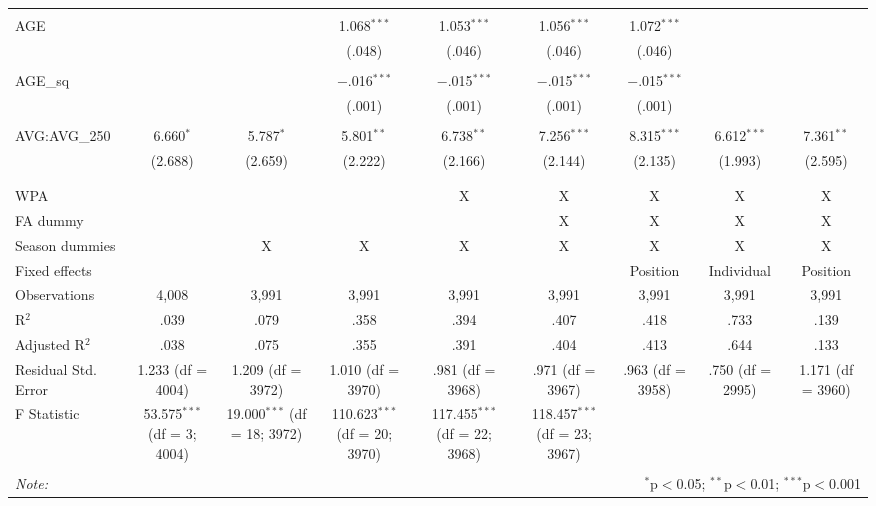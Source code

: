 \begin{table}[H]
\begin{tabular}{@{\extracolsep{5pt}}lcccccccc}
  & & & & & & & & \\
 AGE &  &  & 1.068$^{***}$ & 1.053$^{***}$ & 1.056$^{***}$ & 1.072$^{***}$ &  &  \\
  &  &  & (.048) & (.046) & (.046) & (.046) &  &  \\
  & & & & & & & & \\
 AGE\_sq &  &  & $-$.016$^{***}$ & $-$.015$^{***}$ & $-$.015$^{***}$ & $-$.015$^{***}$ &  &  \\
  &  &  & (.001) & (.001) & (.001) & (.001) &  &  \\
  & & & & & & & & \\
 AVG:AVG\_250 & 6.660$^{*}$ & 5.787$^{*}$ & 5.801$^{**}$ & 6.738$^{**}$ & 7.256$^{***}$ & 8.315$^{***}$ & 6.612$^{***}$ & 7.361$^{**}$ \\
  & (2.688) & (2.659) & (2.222) & (2.166) & (2.144) & (2.135) & (1.993) & (2.595) \\
  & & & & & & & & \\
\hline \\[-1.8ex]
WPA &  &  &  & X & X & X & X & X \\
FA dummy &  &  &  &  & X & X & X & X \\
Season dummies &  & X & X & X & X & X & X & X \\
Fixed effects &  &  &  &  &  & Position & Individual & Position \\
Observations & 4,008 & 3,991 & 3,991 & 3,991 & 3,991 & 3,991 & 3,991 & 3,991 \\
R$^{2}$ & .039 & .079 & .358 & .394 & .407 & .418 & .733 & .139 \\
Adjusted R$^{2}$ & .038 & .075 & .355 & .391 & .404 & .413 & .644 & .133 \\
Residual Std. Error & 1.233 (df = 4004) & 1.209 (df = 3972) & 1.010 (df = 3970) & .981 (df = 3968) & .971 (df = 3967) & .963 (df = 3958) & .750 (df = 2995) & 1.171 (df = 3960) \\
F Statistic & 53.575$^{***}$ (df = 3; 4004) & 19.000$^{***}$ (df = 18; 3972) & 110.623$^{***}$ (df = 20; 3970) & 117.455$^{***}$ (df = 22; 3968) & 118.457$^{***}$ (df = 23; 3967) &  &  &  \\
\hline
\hline \\[-1.8ex]
\textit{Note:}  & \multicolumn{8}{r}{$^{*}$p$<$0.05; $^{**}$p$<$0.01; $^{***}$p$<$0.001} \\
\end{tabular}
\end{table}
